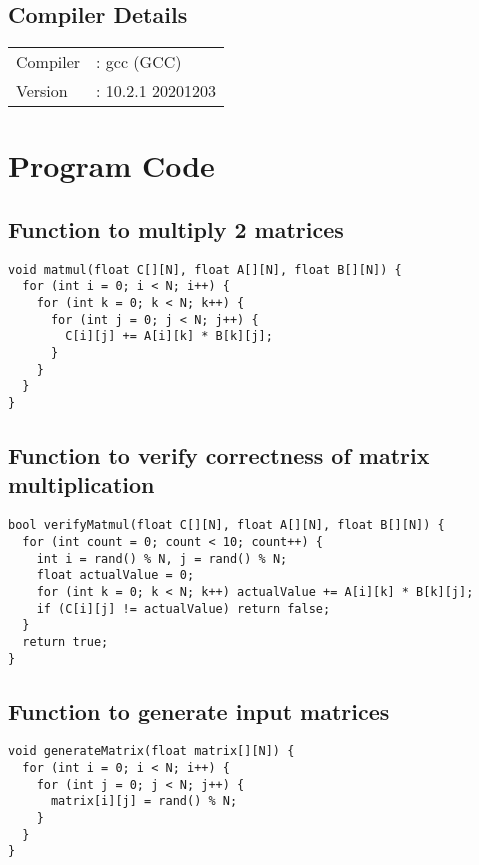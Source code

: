 \documentclass[12pt, letterpaper]{article}
\begin{document}
\subsection{Compiler Details}
\label{sec:compiler}

\begin{tabular}{@{$\bullet$ }ll}
  Compiler &: gcc (GCC)\\
  Version  &: 10.2.1 20201203\\
\end{tabular}

\section{Program Code}
\label{sec:code}

\subsection{Function to multiply 2 matrices}
\label{sec:code-matmul}

\begin{verbatim}
void matmul(float C[][N], float A[][N], float B[][N]) {
  for (int i = 0; i < N; i++) {
    for (int k = 0; k < N; k++) {
      for (int j = 0; j < N; j++) {
        C[i][j] += A[i][k] * B[k][j];
      }
    }
  }
}
\end{verbatim}

\subsection{Function to verify correctness of matrix multiplication}
\label{sec:code-verify}

\begin{verbatim}
bool verifyMatmul(float C[][N], float A[][N], float B[][N]) {
  for (int count = 0; count < 10; count++) {
    int i = rand() % N, j = rand() % N;
    float actualValue = 0;
    for (int k = 0; k < N; k++) actualValue += A[i][k] * B[k][j];
    if (C[i][j] != actualValue) return false;
  }
  return true;
}
\end{verbatim}

\subsection{Function to generate input matrices}
\label{sec:code-generate}

\begin{verbatim}
void generateMatrix(float matrix[][N]) {
  for (int i = 0; i < N; i++) {
    for (int j = 0; j < N; j++) {
      matrix[i][j] = rand() % N;
    }
  }
}
\end{verbatim}
\end{document}
